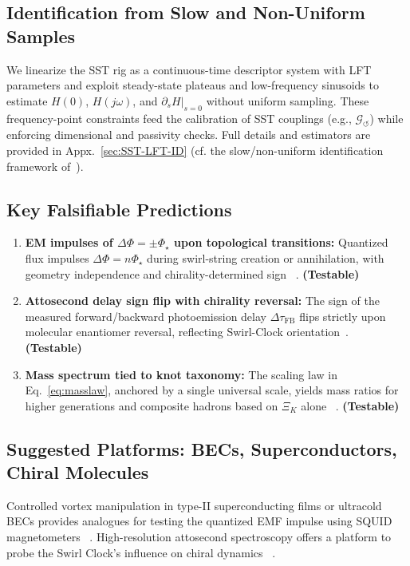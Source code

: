 \documentclass[10pt,reprint,aps,onecolumn,nofootinbib]{revtex4-2}
\newcommand{\testable}{\textbf{(Testable)}}
\begin{document}
    \subsection{Identification from Slow and Non-Uniform Samples}
        \label{sec:methods-lft-id-brief}
        We linearize the SST rig as a continuous-time descriptor system with LFT parameters and exploit
        steady-state plateaus and low-frequency sinusoids to estimate $H(0)$, $H(j\omega)$, and $\partial_s H|_{s=0}$
        without uniform sampling. These frequency-point constraints feed the calibration of SST couplings
        (e.g., $\mathcal{G}_{\!\boldsymbol{\circlearrowleft}}$) while enforcing dimensional and passivity checks. Full details and estimators
        are provided in Appx.~\ref{sec:SST-LFT-ID} (cf. the slow/non-uniform identification framework of~\cite{Zhou2025LFTDescriptorID}).

    \subsection*{Key Falsifiable Predictions}
        \begin{enumerate}
            \item \textbf{EM impulses of $\Delta\Phi = \pm \Phi_\star$ upon topological transitions:} Quantized flux impulses $\Delta\Phi=n\Phi_\star$ during swirl-string creation or annihilation, with geometry independence and chirality-determined sign~ \cite{EM_G}. \testable
            \item \textbf{Attosecond delay sign flip with chirality reversal:} The sign of the measured forward/backward photoemission delay $\Delta\tau_\text{FB}$ flips strictly upon molecular enantiomer reversal, reflecting Swirl-Clock orientation~\cite{sstAttosecondPhotoionization,Nahon2020}. \testable
            \item \textbf{Mass spectrum tied to knot taxonomy:} The scaling law in Eq.~\ref{eq:masslaw}, anchored by a single universal scale, yields mass ratios for higher generations and composite hadrons based on $\Xi_K$ alone~ \cite{sstLagrangian}. \testable
        \end{enumerate}

    \subsection*{Suggested Platforms: BECs, Superconductors, Chiral Molecules}
        Controlled vortex manipulation in type-II superconducting films or ultracold BECs provides analogues for testing the quantized EMF impulse using SQUID magnetometers~ \cite{EM_G}. High-resolution attosecond spectroscopy offers a platform to probe the Swirl Clock’s influence on chiral dynamics~ \cite{sstAttosecondPhotoionization}.
\end{document}
